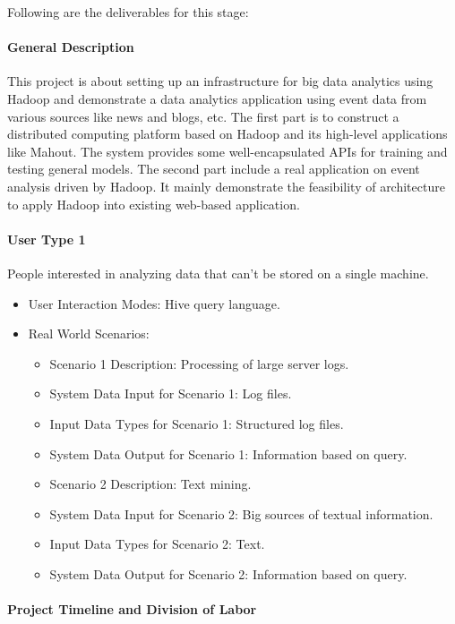 Following are the deliverables for this stage:

\paragraph{General Description}
This project is about setting up an infrastructure for big data analytics using
Hadoop and demonstrate a data analytics application using event data from
various sources like news and blogs, etc. The first part is to construct a
distributed computing platform based on Hadoop and its high-level applications
like Mahout. The system provides some well-encapsulated APIs for training and
testing general models. The second part include a real application on event
analysis driven by Hadoop. It mainly demonstrate the feasibility of
architecture to apply Hadoop into existing web-based application.

\paragraph{User Type 1}

People interested in analyzing data that can't be stored on a single machine.

\begin{itemize}
\item User Interaction Modes: Hive query language.
\item Real World Scenarios:
  \begin{itemize}
  \item Scenario 1 Description: Processing of large server logs.
  \item System Data Input for Scenario 1: Log files.
  \item Input Data Types for Scenario 1: Structured log files.
  \item System Data Output for Scenario 1: Information based on query.
  \item Scenario 2 Description: Text mining.
  \item System Data Input for Scenario 2: Big sources of textual information.
  \item Input Data Types for Scenario 2: Text.
  \item System Data Output for Scenario 2: Information based on query.
  \end{itemize}
\end{itemize}

\paragraph{Project Timeline and Division of Labor}

